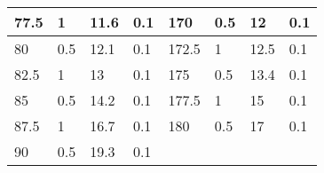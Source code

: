 \begin{table}[]
\begin{tabular}{|l|l|l|l||l|l|l|l|}
77.5  & 1           & 11.6            & 0.1         & 170   & 0.5         & 12              & 0.1         \\ \hline
80    & 0.5         & 12.1            & 0.1         & 172.5 & 1           & 12.5            & 0.1         \\ \hline
82.5  & 1           & 13              & 0.1         & 175   & 0.5         & 13.4            & 0.1         \\ \hline
85    & 0.5         & 14.2            & 0.1         & 177.5 & 1           & 15              & 0.1         \\ \hline
87.5  & 1           & 16.7            & 0.1         & 180   & 0.5         & 17              & 0.1         \\ \hline
90    & 0.5         & 19.3            & 0.1         &       &             &                 &             \\ \hline
\end{tabular}
\end{table}